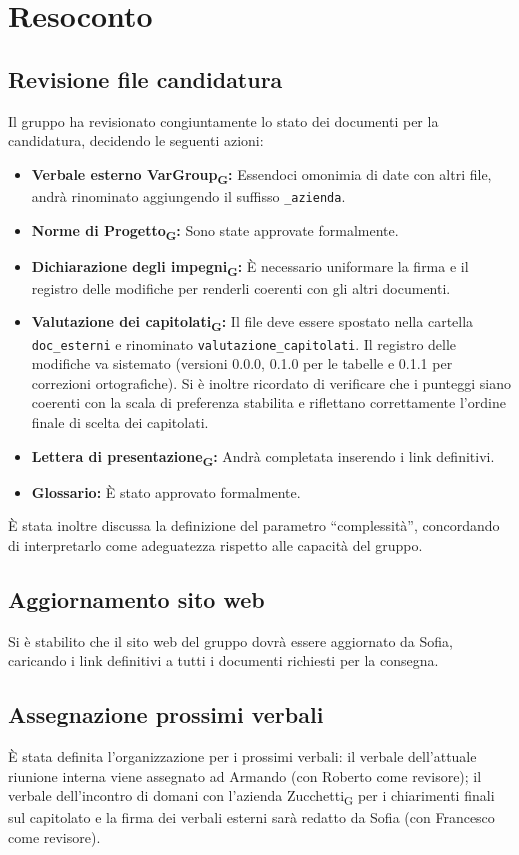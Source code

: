 \section{Resoconto}

\subsection{Revisione file candidatura}
Il gruppo ha revisionato congiuntamente lo stato dei documenti per la candidatura, decidendo le seguenti azioni:
\begin{itemize}
	\item \textbf{Verbale esterno VarGroup\textsubscript{G}:} Essendoci omonimia di date con altri file, andrà rinominato aggiungendo il suffisso \texttt{\_azienda}.
	\item \textbf{Norme di Progetto\textsubscript{G}:} Sono state approvate formalmente.
	\item \textbf{Dichiarazione degli impegni\textsubscript{G}:} È necessario uniformare la firma e il registro delle modifiche per renderli coerenti con gli altri documenti.
	\item \textbf{Valutazione dei capitolati\textsubscript{G}:} Il file deve essere spostato nella cartella \texttt{doc\_esterni} e rinominato \texttt{valutazione\_capitolati}. Il registro delle modifiche va sistemato (versioni 0.0.0, 0.1.0 per le tabelle e 0.1.1 per correzioni ortografiche). Si è inoltre ricordato di verificare che i punteggi siano coerenti con la scala di preferenza stabilita e riflettano correttamente l'ordine finale di scelta dei capitolati.
	\item \textbf{Lettera di presentazione\textsubscript{G}:} Andrà completata inserendo i link definitivi.
	\item \textbf{Glossario:} È stato approvato formalmente.
\end{itemize}
È stata inoltre discussa la definizione del parametro “complessità”, concordando di interpretarlo come adeguatezza rispetto alle capacità del gruppo.

\subsection{Aggiornamento sito web}
Si è stabilito che il sito web del gruppo dovrà essere aggiornato da Sofia, caricando i link definitivi a tutti i documenti richiesti per la consegna.

\subsection{Assegnazione prossimi verbali}
È stata definita l'organizzazione per i prossimi verbali: il verbale dell'attuale riunione interna viene assegnato ad Armando (con Roberto come revisore); il verbale dell'incontro di domani con l'azienda Zucchetti\textsubscript{G} per i chiarimenti finali sul capitolato e la firma dei verbali esterni sarà redatto da Sofia (con Francesco come revisore).

